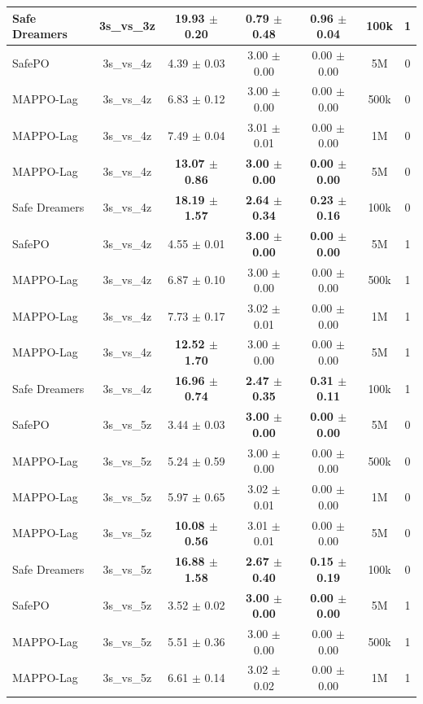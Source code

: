 \begin{longtable}{lcccccc}
Safe Dreamers & 3s\_vs\_3z & \textbf{19.93 $\pm$ 0.20} & \textbf{0.79 $\pm$ 0.48} & \textbf{0.96 $\pm$ 0.04} & 100k & 1 \\
\midrule
SafePO & 3s\_vs\_4z & 4.39 $\pm$ 0.03 & 3.00 $\pm$ 0.00 & 0.00 $\pm$ 0.00 & 5M & 0 \\
MAPPO-Lag & 3s\_vs\_4z & 6.83 $\pm$ 0.12 & 3.00 $\pm$ 0.00 & 0.00 $\pm$ 0.00 & 500k & 0 \\
MAPPO-Lag & 3s\_vs\_4z & 7.49 $\pm$ 0.04 & 3.01 $\pm$ 0.01 & 0.00 $\pm$ 0.00 & 1M & 0 \\
MAPPO-Lag & 3s\_vs\_4z & \textbf{13.07 $\pm$ 0.86} & \textbf{3.00 $\pm$ 0.00} & \textbf{0.00 $\pm$ 0.00} & 5M & 0 \\
Safe Dreamers & 3s\_vs\_4z & \textbf{18.19 $\pm$ 1.57} & \textbf{2.64 $\pm$ 0.34} & \textbf{0.23 $\pm$ 0.16} & 100k & 0 \\
\midrule
SafePO & 3s\_vs\_4z & 4.55 $\pm$ 0.01 & \textbf{3.00 $\pm$ 0.00} & \textbf{0.00 $\pm$ 0.00} & 5M & 1 \\
MAPPO-Lag & 3s\_vs\_4z & 6.87 $\pm$ 0.10 & 3.00 $\pm$ 0.00 & 0.00 $\pm$ 0.00 & 500k & 1 \\
MAPPO-Lag & 3s\_vs\_4z & 7.73 $\pm$ 0.17 & 3.02 $\pm$ 0.01 & 0.00 $\pm$ 0.00 & 1M & 1 \\
MAPPO-Lag & 3s\_vs\_4z & \textbf{12.52 $\pm$ 1.70} & 3.00 $\pm$ 0.00 & 0.00 $\pm$ 0.00 & 5M & 1 \\
Safe Dreamers & 3s\_vs\_4z & \textbf{16.96 $\pm$ 0.74} & \textbf{2.47 $\pm$ 0.35} & \textbf{0.31 $\pm$ 0.11} & 100k & 1 \\
\midrule
SafePO & 3s\_vs\_5z & 3.44 $\pm$ 0.03 & \textbf{3.00 $\pm$ 0.00} & \textbf{0.00 $\pm$ 0.00} & 5M & 0 \\
MAPPO-Lag & 3s\_vs\_5z & 5.24 $\pm$ 0.59 & 3.00 $\pm$ 0.00 & 0.00 $\pm$ 0.00 & 500k & 0 \\
MAPPO-Lag & 3s\_vs\_5z & 5.97 $\pm$ 0.65 & 3.02 $\pm$ 0.01 & 0.00 $\pm$ 0.00 & 1M & 0 \\
MAPPO-Lag & 3s\_vs\_5z & \textbf{10.08 $\pm$ 0.56} & 3.01 $\pm$ 0.01 & 0.00 $\pm$ 0.00 & 5M & 0 \\
Safe Dreamers & 3s\_vs\_5z & \textbf{16.88 $\pm$ 1.58} & \textbf{2.67 $\pm$ 0.40} & \textbf{0.15 $\pm$ 0.19} & 100k & 0 \\
\midrule
SafePO & 3s\_vs\_5z & 3.52 $\pm$ 0.02 & \textbf{3.00 $\pm$ 0.00} & \textbf{0.00 $\pm$ 0.00} & 5M & 1 \\
MAPPO-Lag & 3s\_vs\_5z & 5.51 $\pm$ 0.36 & 3.00 $\pm$ 0.00 & 0.00 $\pm$ 0.00 & 500k & 1 \\
MAPPO-Lag & 3s\_vs\_5z & 6.61 $\pm$ 0.14 & 3.02 $\pm$ 0.02 & 0.00 $\pm$ 0.00 & 1M & 1 \\

\end{longtable}
